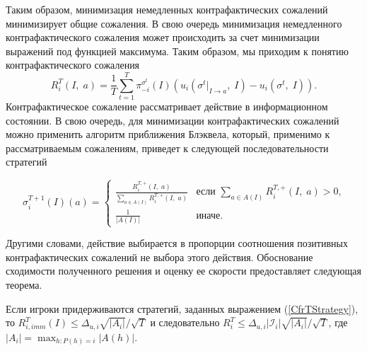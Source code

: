 Таким образом, минимизация немедленных контрафактических сожалений минимизирует общие сожаления. В свою очередь минимизация немедленного контрафактического сожаления может происходить за счет минимизации выражений под функцией максимума. Таким образом, мы приходим к понятию контрафактического сожаления 
\begin{equation}
	R_i^T(I,\; a) = \frac{1}{T}\sum_{t=1}^{T}\pi_{-i}^{\sigma^t}(I)(u_i(\sigma^t |_{I \to a},\;I)-u_i(\sigma^t,\;I)).
\end{equation}
Контрафактическое сожаление рассматривает действие в информационном состоянии. В свою очередь, для минимизации контрафактических сожалений можно применить алгоритм приближения Блэквела, который, применимо к рассматриваемым сожалениям, приведет к следующей последовательности стратегий 

\begin{equation}\label{CfrTStrategy}
	\sigma_i^{T+1}(I)(a)= 
	\begin{cases}
		\frac{R_i^{T,+}(I,\;a)}{\sum_{a\in A(I)}R_i^{T,+}(I,\;a)} &\text{если $\sum_{a\in A(I)}R_i^{T,+}(I,\;a) > 0$,}\\
		\frac{1}{|A(I)|} &\text{иначе.}
	\end{cases}
\end{equation}

Другими словами, действие выбирается в пропорции соотношения позитивных контрафактических сожалений не выбора этого действия. Обоснование сходимости полученного решения и оценку ее скорости предоставляет следующая теорема. 

\begin{theo}
	Если игроки придерживаются стратегий, заданных выражением (\ref{CfrTStrategy}), то $R_{i,imm}^T(I) \leq \Delta_{u,i}\sqrt{|A_i|}/\sqrt{T}$ и следовательно $R_i^T \leq \Delta_{u,i}|\mathcal{I}_i|\sqrt{|A_i|}/\sqrt{T}$, где $|A_i|=\max_{h\colon P(h)=i}|A(h)|$.
\end{theo}